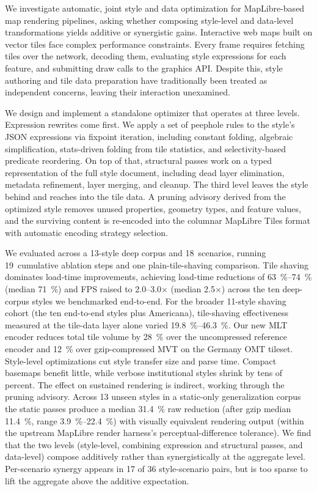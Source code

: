 We investigate automatic, joint style and data optimization for MapLibre-based map rendering pipelines, asking whether composing style-level and data-level transformations yields additive or synergistic gains.
Interactive web maps built on vector tiles face complex performance constraints.
Every frame requires fetching tiles over the network, decoding them, evaluating style expressions for each feature, and submitting draw calls to the graphics \ac{API}.
Despite this, style authoring and tile data preparation have traditionally been treated as independent concerns, leaving their interaction unexamined.

We design and implement a standalone optimizer that operates at three levels.
Expression rewrites come first.
We apply a set of peephole rules to the style's \ac{JSON} expressions via fixpoint iteration, including constant folding, algebraic simplification, stats-driven folding from tile statistics, and selectivity-based predicate reordering.
On top of that, structural passes work on a typed representation of the full style document, including dead layer elimination, metadata refinement, layer merging, and cleanup.
The third level leaves the style behind and reaches into the tile data.
A pruning advisory derived from the optimized style removes unused properties, geometry types, and feature values, and the surviving content is re-encoded into the columnar MapLibre Tiles format with automatic encoding strategy selection.

We evaluated across a 13-style deep corpus and 18~scenarios, running 19~cumulative ablation steps and one plain-tile-shaving comparison.
Tile shaving dominates load-time improvements, achieving load-time reductions of \qtyrange{63}{74}{\percent} (median \qty{71}{\percent}) and \ac{FPS} raised to \numrange{2.0}{3.0}$\times$ (median \num{2.5}$\times$) across the ten deep-corpus styles we benchmarked end-to-end.
For the broader 11-style shaving cohort (the ten end-to-end styles plus Americana), tile-shaving effectiveness measured at the tile-data layer alone varied \qtyrange{19.8}{46.3}{\percent}.
Our new \ac{MLT} encoder reduces total tile volume by \qty{28}{\percent} over the uncompressed reference encoder and \qty{12}{\percent} over gzip-compressed \ac{MVT} on the Germany \ac{OMT} tileset.
Style-level optimizations cut style transfer size and parse time. Compact basemaps benefit little, while verbose institutional styles shrink by tens of percent. The effect on sustained rendering is indirect, working through the pruning advisory.
Across 13 unseen styles in a static-only generalization corpus the static passes produce a median \qty{31.4}{\percent} raw reduction (after gzip median \qty{11.4}{\percent}, range \qtyrange{3.9}{22.4}{\percent}) with visually equivalent rendering output (within the upstream MapLibre render harness's perceptual-difference tolerance).
We find that the two levels (style-level, combining expression and structural passes, and data-level) compose additively rather than synergistically at the aggregate level.
Per-scenario synergy appears in 17 of 36 style-scenario pairs, but is too sparse to lift the aggregate above the additive expectation.
